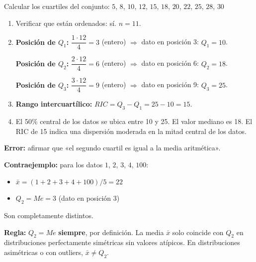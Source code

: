 \documentclass[11pt, letterpaper]{article}
\begin{document}
\begin{tcolorbox}[examplebox, title={Ej. 9. Cálculo de cuartiles}]
Calcular los cuartiles del conjunto: $5$, $8$, $10$, $12$, $15$, $18$, $20$, $22$, $25$, $28$, $30$

\begin{enumerate}[label=\textbf{\arabic*.}, leftmargin=2.8cm]
  \item[\textbf{Paso 1.}] Verificar que están ordenados: sí. $n = 11$.

  \medskip
  \item[\textbf{Paso 2.}] \textbf{Posición de $Q_1$:} $\dfrac{1 \cdot 12}{4} = 3$ (entero) $\Rightarrow$ dato en posición 3: $Q_1 = 10$.

  \textbf{Posición de $Q_2$:} $\dfrac{2 \cdot 12}{4} = 6$ (entero) $\Rightarrow$ dato en posición 6: $Q_2 = 18$.

  \textbf{Posición de $Q_3$:} $\dfrac{3 \cdot 12}{4} = 9$ (entero) $\Rightarrow$ dato en posición 9: $Q_3 = 25$.

  \medskip
  \item[\textbf{Paso 3.}] \textbf{Rango intercuartílico:} $RIC = Q_3 - Q_1 = 25 - 10 = 15$.

  \medskip
  \item[\textbf{Conclusión.}] El 50\% central de los datos se ubica entre 10 y 25. El valor mediano es 18. El RIC de 15 indica una dispersión moderada en la mitad central de los datos.
\end{enumerate}
\end{tcolorbox}

\begin{tcolorbox}[warningbox, title={Error frecuente: confundir $Q_2$ con la media aritmética}]
\textbf{Error:} afirmar que «el segundo cuartil es igual a la media aritmética».

\medskip
\textbf{Contraejemplo:} para los datos $1$, $2$, $3$, $4$, $100$:
\begin{itemize}
  \item $\bar{x} = (1+2+3+4+100)/5 = 22$
  \item $Q_2 = Me = 3$ (dato en posición 3)
\end{itemize}
Son completamente distintos.

\medskip
\textbf{Regla:} $Q_2 = Me$ \textbf{siempre}, por definición. La media $\bar{x}$ solo coincide con $Q_2$ en distribuciones perfectamente simétricas sin valores atípicos. En distribuciones asimétricas o con outliers, $\bar{x} \neq Q_2$.
\end{tcolorbox}
\end{document}
